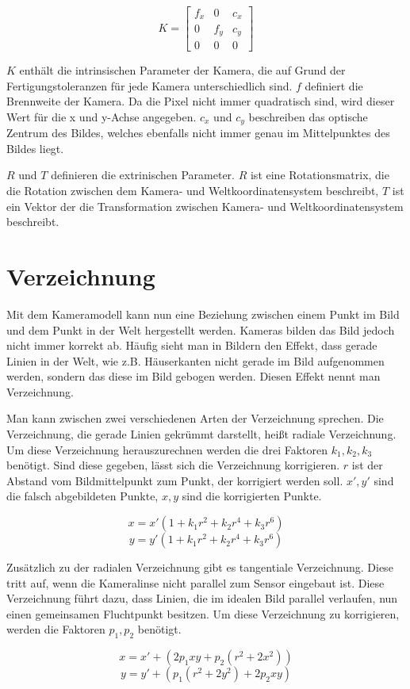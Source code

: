\begin{equation}
  K = 
  \begin{bmatrix}
  	f_x & 0 & c_x \\
  	0 & f_y & c_y \\
  	0 & 0 & 0
  \end{bmatrix}
\end{equation}

$K$ enthält die intrinsischen Parameter der Kamera, die auf Grund der Fertigungstoleranzen für jede Kamera unterschiedlich sind. $f$ definiert die Brennweite der Kamera. Da die Pixel nicht immer quadratisch sind, wird dieser Wert für die x und y-Achse angegeben. $c_x$ und $c_y$ beschreiben das optische Zentrum des Bildes, welches ebenfalls nicht immer genau im Mittelpunktes des Bildes liegt.

$R$ und $T$ definieren die extrinischen Parameter. $R$ ist eine Rotationsmatrix, die die Rotation zwischen dem Kamera- und Weltkoordinatensystem beschreibt, $T$ ist ein Vektor der die Transformation zwischen Kamera- und Weltkoordinatensystem beschreibt.

\section{Verzeichnung} %
\label{sec:verzeichnung}
Mit dem Kameramodell kann nun eine Beziehung zwischen einem Punkt im Bild und dem Punkt in der Welt hergestellt werden. Kameras bilden das Bild jedoch nicht immer korrekt ab. Häufig sieht man in Bildern den Effekt, dass gerade Linien in der Welt, wie z.B. Häuserkanten nicht gerade im Bild aufgenommen werden, sondern das diese im Bild gebogen werden. Diesen Effekt nennt man Verzeichnung.

Man kann zwischen zwei verschiedenen Arten der Verzeichnung sprechen. Die Verzeichnung, die gerade Linien gekrümmt darstellt, heißt radiale Verzeichnung. Um diese Verzeichnung herauszurechnen werden die drei Faktoren $k_1, k_2, k_3$ benötigt. Sind diese gegeben, lässt sich die Verzeichnung korrigieren. $r$ ist der Abstand vom Bildmittelpunkt zum Punkt, der korrigiert werden soll. $x', y'$ sind die falsch abgebildeten Punkte, $x,y$ sind die korrigierten Punkte.

\begin{equation}
	x = x'(1 + k_1 r^2 + k_2 r^4 + k_3 r^6)
\end{equation}
\begin{equation}
	y = y'(1 + k_1 r^2 + k_2 r^4 + k_3 r^6)
\end{equation}

Zusätzlich zu der radialen Verzeichnung gibt es tangentiale Verzeichnung. Diese tritt auf, wenn die Kameralinse nicht parallel zum Sensor eingebaut ist. Diese Verzeichnung führt dazu, dass Linien, die im idealen Bild parallel verlaufen, nun einen gemeinsamen Fluchtpunkt besitzen. Um diese Verzeichnung zu korrigieren, werden die Faktoren $p_1, p_2$ benötigt.

\begin{equation}
	x = x' + (2 p_1 xy + p_2 (r^2 + 2 x^2))
\end{equation}
\begin{equation}
	y = y' + (p_1(r^2 + 2 y^2) + 2p_2 xy)
\end{equation}